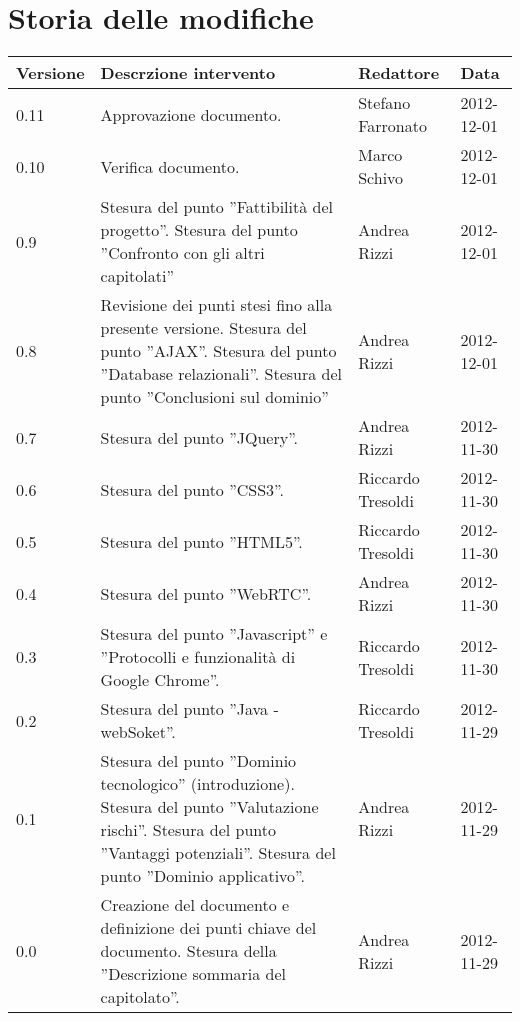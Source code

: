 \section*{Storia delle modifiche}
\begin{tabularx}{\textwidth}{lXll}
\toprule
Versione & Descrzione intervento & Redattore & Data\\
\midrule %
0.11 & Approvazione documento. & Stefano Farronato & 2012-12-01\\
0.10 & Verifica documento. & Marco Schivo & 2012-12-01\\
0.9 & Stesura del punto ''Fattibilità del progetto''. Stesura del punto ''Confronto con gli altri capitolati'' & Andrea Rizzi & 2012-12-01\\
0.8 & Revisione dei punti stesi fino alla presente versione. Stesura del punto ''AJAX''. Stesura del punto ''Database relazionali''. Stesura del punto ''Conclusioni sul dominio'' & Andrea Rizzi & 2012-12-01\\
0.7 & Stesura del punto ''JQuery''. & Andrea Rizzi & 2012-11-30\\
0.6 & Stesura del punto ''CSS3''. & Riccardo Tresoldi & 2012-11-30\\
0.5 & Stesura del punto ''HTML5''. & Riccardo Tresoldi& 2012-11-30\\
0.4 & Stesura del punto ''WebRTC''. & Andrea Rizzi & 2012-11-30\\
0.3 & Stesura del punto ''Javascript'' e ''Protocolli e funzionalità di Google Chrome''.  & Riccardo Tresoldi & 2012-11-30\\
0.2 & Stesura del punto ''Java - webSoket''.  & Riccardo Tresoldi & 2012-11-29\\
0.1 & Stesura del punto ''Dominio tecnologico'' (introduzione). Stesura del punto ''Valutazione rischi''. Stesura del punto ''Vantaggi potenziali''. Stesura del punto ''Dominio applicativo''.  & Andrea Rizzi & 2012-11-29\\
0.0 & Creazione del documento e definizione dei punti chiave del documento. Stesura della ''Descrizione sommaria del capitolato''. & Andrea Rizzi & 2012-11-29\\
\bottomrule
\end{tabularx}
\newpage



\setcounter{page}{1}
\pagestyle{normal}


